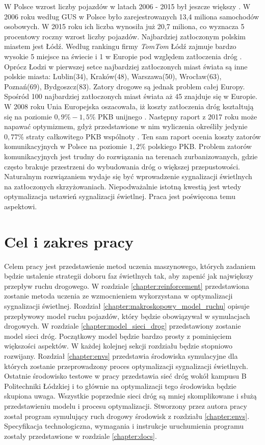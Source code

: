 \documentclass[12pt]{book}
\theoremstyle{plain}
\begin{document}
W Polsce wzrost liczby pojazdów w latach 2006 - 2015 był jeszcze większy \cite{liczbaPojazdowPolska}. W 2006 roku według GUS w Polsce było zarejestrowanych 13,4 miliona samochodów osobowych. W 2015 roku ich liczba wynosiła już 20,7 miliona, co wyznacza 5 procentowy roczny wzrost liczby pojazdów.
Najbardziej zatłoczonym polskim miastem jest Łódź. Według rankingu firmy \textit{TomTom } Łódź zajmuje bardzo wysokie 5 miejsce na świecie i 1 w Europie pod względem zatłoczenia dróg \cite{rankingTomTom}. Oprócz Łodzi w pierwszej setce najbardziej zatłoczonych miast świata są inne polskie miasta: Lublin(34), Kraków(48), Warszawa(50), Wrocław(63), Poznań(69), Bydgoszcz(83). Zatory drogowe są jednak problem całej Europy. Spośród 100 najbardziej zatłoczonych miast świata aż 45 znajduje się w Europie. W 2008 roku Unia Europejska oszacowała, iż koszty zatłoczenia dróg kształtują się na poziomie $0,9\%-1,5\%$ PKB unijnego \cite{ue2008}. Następny raport z 2017 roku może napawać optymizmem, gdyż przedstawione w nim wyliczenia określiły jedynie $0,77\%$ straty całkowitego PKB wspólnoty \cite{ue2017}. Ten sam raport ocenia koszty zatorów komunikacyjnych w Polsce na poziomie $1,2\%$ polskiego PKB.
Problem zatorów komunikacyjnych jest trudny do rozwiązania na terenach zurbanizowanych, gdzie często brakuje przestrzeni do wybudowania dróg o większej przepustowości. Naturalnym rozwiązaniem wydaje się być wprowadzenie sygnalizacji świetlnych na zatłoczonych skrzyżowaniach. Niepodważalnie istotną kwestią jest wtedy optymalizacja ustawień sygnalizacji świetlnej. Praca jest poświęcona temu aspektowi.

\chapter{Cel i zakres pracy} \label{sec:cel_zakres_pracy}
Celem pracy jest przedstawienie metod uczenia maszynowego, których zadaniem będzie ustalenie strategii doboru faz świetlnych tak, aby zapenić jak największy przepływ ruchu drogowego. W rozdziale \ref{chapter:reinforcement} przedstawiona zostanie metoda uczenia ze wzmocnieniem wykorzystana w optymalizacji sygnalizacji świetlnej. Rozdział \ref{chapter:makroskopowy_model_ruchu} opisuje przepływowy model ruchu pojazdów, który będzie obowiązywał w symulacjach drogowych. W rozdziale \ref{chapter:model_sieci_drog} przedstawiony zostanie model sieci dróg. Początkowy model będzie bardzo prosty z pominięciem większości aspektów. W każdej kolejnej sekcji rozdziału będzie stopniowo rozwijany. Rozdział \ref{chapter:envs} przedstawia środowiska symulacyjne dla których zostanie przeprowadzony proces optymalizacji sygnalizacji świetlnych. Ostatnie środowisko testowe w pracy przedstawia sieć dróg wokół kampusu B Politechniki Łódzkiej i to głównie na optymalizacji tego środowiska będzie skupiona uwaga. Wszystkie poprzednie sieci dróg są mniej skomplikowane i służą przedstawieniu modelu i procesu optymalizacji. Stworzony przez autora pracy został program symulujący ruch drogowy środowisk z rozdziału \ref{chapter:envs}. Specyfikacja technologiczna, wymagania i instrukcje uruchumienia programu zostały przedstawione w rozdziale \ref{chapter:docs}.
\end{document}

